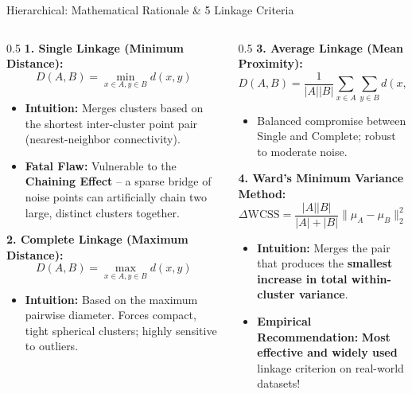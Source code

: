 \documentclass[aspectratio=169,10pt]{beamer}
\begin{document}
\begin{frame}{Hierarchical: Mathematical Rationale \& 5 Linkage Criteria}
  \footnotesize
  \begin{columns}[T]
    \begin{column}{0.5\textwidth}
      \textbf{1. Single Linkage (Minimum Distance):}
      $$D(A, B) = \min_{x \in A, y \in B} d(x, y)$$
      \begin{itemize}\setlength{\itemsep}{1pt}
        \item \textbf{Intuition:} Merges clusters based on the shortest inter-cluster point pair (nearest-neighbor connectivity).
        \item \textbf{Fatal Flaw:} Vulnerable to the \textbf{Chaining Effect} -- a sparse bridge of noise points can artificially chain two large, distinct clusters together.
      \end{itemize}
      \vspace{0.2em}
      \textbf{2. Complete Linkage (Maximum Distance):}
      $$D(A, B) = \max_{x \in A, y \in B} d(x, y)$$
      \begin{itemize}\setlength{\itemsep}{1pt}
        \item \textbf{Intuition:} Based on the maximum pairwise diameter. Forces compact, tight spherical clusters; highly sensitive to outliers.
      \end{itemize}
    \end{column}
    \begin{column}{0.5\textwidth}
      \textbf{3. Average Linkage (Mean Proximity):}
      $$D(A, B) = \frac{1}{|A||B|}\sum_{x \in A}\sum_{y \in B} d(x, y)$$
      \begin{itemize}\setlength{\itemsep}{1pt}
        \item Balanced compromise between Single and Complete; robust to moderate noise.
      \end{itemize}
      \vspace{0.2em}
      \textbf{4. Ward's Minimum Variance Method:}
      $$\Delta \text{WCSS} = \frac{|A||B|}{|A| + |B|}\|\mu_A - \mu_B\|_2^2$$
      \begin{itemize}\setlength{\itemsep}{1pt}
        \item \textbf{Intuition:} Merges the pair that produces the \textbf{smallest increase in total within-cluster variance}.
        \item \textbf{Empirical Recommendation:} \textbf{Most effective and widely used} linkage criterion on real-world datasets!
      \end{itemize}
    \end{column}
  \end{columns}
\end{frame}
\end{document}

